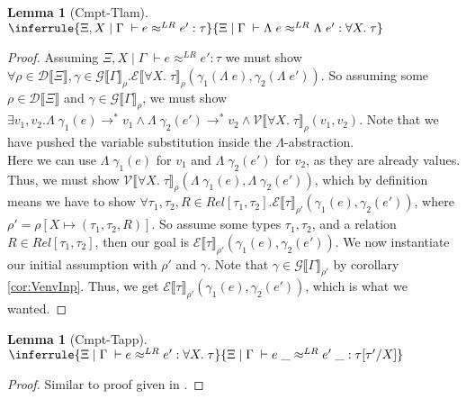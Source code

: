 \documentclass[a4paper, 11pt]{report}
\newtheorem{lemma}[theorem]{Lemma}
\theoremstyle{definition}
\newcommand{\expr}{e}
\newcommand{\val}{v}
\newcommand{\Tvar}{X}
\newcommand{\Tlam}{\Lambda\;}
\newcommand{\Tapp}[1]{#1\;\_}
\newcommand{\subst}[3]{#1{\left[#3 \middle/ #2 \right]}}
\newcommand{\Tall}[2]{\forall #1.\; #2}
\newcommand{\typ}{\tau}
\newcommand{\venv}{\Gamma}
\newcommand{\tenv}{\Xi}
\newcommand{\jdgRel}[6]{#1 \; | \; #2 \; \vdash #3 \approx^{#4} #5 : #6}
\newcommand{\stepS}{\rightarrow^*}
\newcommand{\ValInp}[2]{\mathcal{V} \llbracket #1 \rrbracket_{#2}}
\newcommand{\ExpInp}[2]{\mathcal{E} \llbracket #1 \rrbracket_{#2}}
\newcommand{\VenvInp}[2]{\mathcal{G} \llbracket #1 \rrbracket_{#2}}
\newcommand{\TenvInp}[1]{\mathcal{D} \llbracket #1 \rrbracket}
\newcommand{\LogRel}[5]{\jdgRel{#1}{#2}{#3}{LR}{#4}{#5}}
\newcommand{\map}[2]{#1 \mapsto #2}
\begin{document}
\begin{lemma}[Cmpt-Tlam]
  $\inferrule
  { \LogRel{\tenv, \Tvar}{\venv}{\expr}{\expr'}{\typ} }
  { \LogRel{\tenv}{\venv}{\Tlam{\expr}}{\Tlam{\expr'}}{\Tall{\Tvar}{\typ}} }$
\end{lemma}
\begin{proof}
  Assuming $\LogRel{\tenv, \Tvar}{\venv}{\expr}{\expr'}{\typ}$ we must show $\forall \rho \in \TenvInp{\tenv}, \gamma \in \VenvInp{\venv}{\rho} . \ExpInp{\Tall{\Tvar}{\typ}}{\rho}(\gamma_1(\Tlam{\expr}), \gamma_2(\Tlam{\expr'}))$. So assuming some $\rho \in \TenvInp{\tenv}$ and $\gamma \in \VenvInp{\venv}{\rho}$, we must show $\exists \val_1, \val_2 . \Tlam{\gamma_1(\expr)} \stepS \val_1 \land \Tlam{\gamma_2(\expr')} \stepS \val_2 \land \ValInp{\Tall{\Tvar}{\typ}}{\rho}(\val_1, \val_2)$. Note that we have pushed the variable substitution inside the $\Lambda$-abstraction.\\
  Here we can use $\Tlam{\gamma_1(\expr)}$ for $\val_1$ and $\Tlam{\gamma_2(\expr')}$ for $\val_2$, as they are already values. Thus, we must show $\ValInp{\Tall{\Tvar}{\typ}}{\rho}(\Tlam{\gamma_1(\expr)}, \Tlam{\gamma_2(\expr')})$, which by definition means we have to show $\forall \typ_1, \typ_2, R \in Rel[\typ_1, \typ_2] . \ExpInp{\typ}{\rho'}(\gamma_1(\expr), \gamma_2(\expr'))$, where $\rho' = \rho[\map{\Tvar}{(\typ_1, \typ_2, R)}]$. So assume some types $\typ_1, \typ_2$, and a relation $R \in Rel[\typ_1, \typ_2]$, then our goal is $\ExpInp{\typ}{\rho'}(\gamma_1(\expr), \gamma_2(\expr'))$.
  We now instantiate our initial assumption with $\rho'$ and $\gamma$. Note that $\gamma \in \VenvInp{\venv}{\rho'}$ by corollary \ref{cor:VenvInp}. Thus, we get $\ExpInp{\typ}{\rho'}(\gamma_1(\expr), \gamma_2(\expr'))$, which is what we wanted.
\end{proof}

\begin{lemma}[Cmpt-Tapp]
  $\inferrule
  { \LogRel{\tenv}{\venv}{\expr}{\expr'}{\Tall{\Tvar}{\typ}} }
  { \LogRel{\tenv}{\venv}{\Tapp{\expr}}{\Tapp{\expr'}}{\subst{\typ}{\Tvar}{\typ'}} }$
\end{lemma}
\begin{proof}
  Similar to proof given in \cite{DBLP:journals/corr/abs-1907-11133}.
\end{proof}
\end{document}
